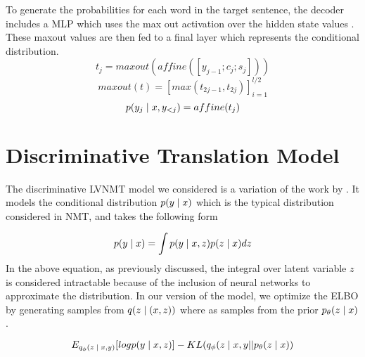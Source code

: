 To generate the probabilities for each word in the target sentence, the decoder includes a \ac{MLP} which uses the max out activation over the hidden state values \cite{goodfellow2013maxout}. These maxout values are then fed to a final layer which represents the conditional distribution.  
\begin{equation}
	t_{j} = maxout(affine([y_{j-1}; c_{j}; s_{j} ]))
\end{equation}
\begin{equation}
	maxout(t) = [max(t_{2j -1}, t_{2j})]_{i=1}^{l / 2}
\end{equation}
\begin{equation}
p(y_{j} \; | \;{x, y_{<j}}) = affine(t_{j})
\end{equation}


\section{Discriminative Translation Model}


The discriminative \ac{LVNMT} model we considered is a variation of the work by \citet{Zhang2016VNMT}. It models the conditional distribution $p(y \; | \;{x})$ which is the typical distribution considered in \ac{NMT}, and takes the following form 

\begin{equation}
p(y \; | \;{x})  = \int p(y \; | \;{x,z}) p(z \; | \;{x}) dz
\end{equation}
In the above equation, as previously discussed, the integral over latent variable $z$ is considered intractable because of the inclusion of neural networks to approximate the distribution. In our version of the model, we optimize the \ac{ELBO} by generating samples from $q(z \; | \;(x,z))$ where as \cite{Zhang2016VNMT} samples from the prior $p_{\theta}(z \; | \;{x})$.  %

\begin{equation}
E_{q_{\phi}(z \; | \;{x, y})}  [logp(y \; | \;{x, z} ) ] - KL (q_{\phi}(z \; | \;{x, y} || p_{\theta}(z \; | \;{x}))
\end{equation}



